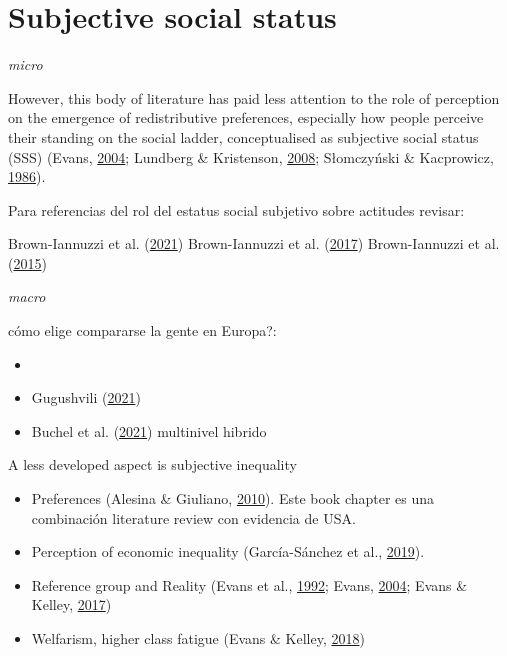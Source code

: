\documentclass[
  12pt,
]{book}
\providecommand{\tightlist}{%
  \setlength{\itemsep}{0pt}\setlength{\parskip}{0pt}}
\begin{document}
\hypertarget{subjective-social-status}{%
\section{Subjective social status}\label{subjective-social-status}}

\emph{micro}

However, this body of literature has paid less attention to the role of perception on the emergence of redistributive preferences, especially how people perceive their standing on the social ladder, conceptualised as subjective social status (SSS) (Evans, \protect\hyperlink{ref-Evans2004}{2004}; Lundberg \& Kristenson, \protect\hyperlink{ref-Lundberg2008}{2008}; Słomczyński \& Kacprowicz, \protect\hyperlink{ref-slomczynski1987}{1986}).

Para referencias del rol del estatus social subjetivo sobre actitudes revisar:

Brown-Iannuzzi et al. (\protect\hyperlink{ref-brown-iannuzzi_privileged_2021}{2021})
Brown-Iannuzzi et al. (\protect\hyperlink{ref-brown-iannuzzi_relationship_2017}{2017})
Brown-Iannuzzi et al. (\protect\hyperlink{ref-brown-iannuzzi_subjective_2015}{2015})

\emph{macro}

cómo elige compararse la gente en Europa?:

\begin{itemize}
\tightlist
\item
\item
  Gugushvili (\protect\hyperlink{ref-gugushvili_which_2021}{2021})
\item
  Buchel et al. (\protect\hyperlink{ref-buchel_objective_2021}{2021}) multinivel hibrido
\end{itemize}

A less developed aspect is subjective inequality

\begin{itemize}
\tightlist
\item
  Preferences (Alesina \& Giuliano, \protect\hyperlink{ref-alesina_preferences_2010}{2010}). Este book chapter es una combinación literature review con evidencia de USA.
\item
  Perception of economic inequality (García-Sánchez et al., \protect\hyperlink{ref-Garcia-Sanchez19}{2019}).
\item
  Reference group and Reality (Evans et al., \protect\hyperlink{ref-Evans1992}{1992}; Evans, \protect\hyperlink{ref-Evans2004}{2004}; Evans \& Kelley, \protect\hyperlink{ref-Evans2017}{2017})
\item
  Welfarism, higher class fatigue (Evans \& Kelley, \protect\hyperlink{ref-evans_strong_2018}{2018})
\end{itemize}
\end{document}
